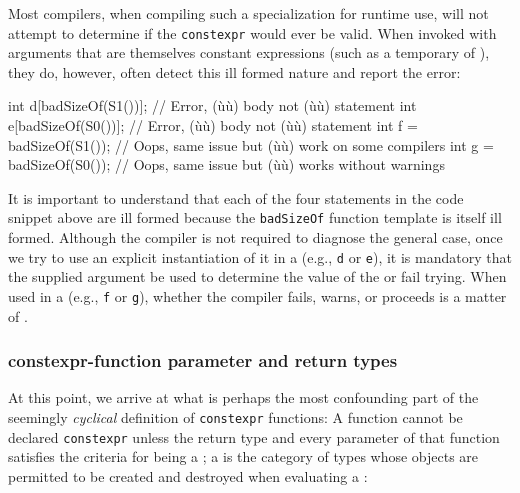 \noindent Most compilers, when compiling such a specialization for runtime use,
will not attempt to determine if the \lstinline!constexpr! would ever be
valid. When invoked with arguments that are themselves constant
expressions (such as a temporary of ), they do,
however, often detect this ill formed nature and report the error:

\begin{emcppslisting}[emcppsbatch=e7,emcppsignore={all fail somewhere}]
int d[badSizeOf(S1())];  // Error, (ù{}ù) body not (ù{}ù) statement
int e[badSizeOf(S0())];  // Error, (ù{}ù) body not (ù{}ù) statement
int f = badSizeOf(S1()); // Oops, same issue but (ù{}ù) work on some compilers
int g = badSizeOf(S0()); // Oops, same issue but (ù{}ù) works without warnings
\end{emcppslisting}
    

\noindent It is important to understand that each of the four statements in the
code snippet above are ill formed because the \lstinline!badSizeOf!
function template is itself ill formed. Although the compiler is not
required to diagnose the general case, once we try to use an explicit
instantiation of it in a  (e.g.,
\lstinline!d! or \lstinline!e!), it is mandatory that the supplied argument be
used to determine the value of the  or fail
trying. When used in a  (e.g.,
\lstinline!f! or \lstinline!g!), whether the compiler fails, warns, or
proceeds is a matter of .

\subsubsection[\lstinline!constexpr!-function parameter and return types]{{\SubsubsecCode constexpr}-function parameter and return types}\label{constexpr-function-parameter-and-return-types}

At this point, we arrive at what is perhaps the most confounding part of
the seemingly \emph{cyclical} definition of \lstinline!constexpr!
functions: A function cannot be declared \lstinline!constexpr! unless the
return type and every parameter of that function satisfies the criteria
for being a ; a  is the
category of types whose objects are permitted to be created and
destroyed when evaluating a :

